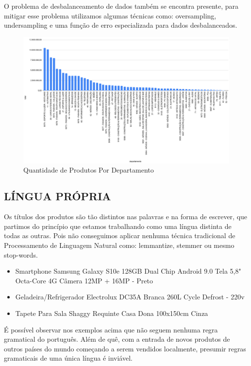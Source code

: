O problema de desbalanceamento de dados também se encontra presente, para mitigar esse problema utilizamos algumas técnicas como: oversampling, undersampling e  uma função de erro especializada para  dados desbalanceados.

\begin{figure}[htb]
	\caption{\label{char_bar_produtos_por_categoria} Quantidade de Produtos Por Departamento}
	\begin{center}
	    \includegraphics[width=\textwidth]{artigo/recursos/imagens/Quantidade de Produtos por Departamento.png}
	\end{center}
\end{figure}

\subsection{LÍNGUA PRÓPRIA}

Os títulos dos produtos são tão distintos nas palavras e na forma de escrever, que partimos do princípio que estamos trabalhando como uma língua distinta de todas as outras. Pois não conseguimos aplicar nenhuma técnica tradicional de Processamento de Linguagem Natural como: lemmantize, stemmer ou mesmo stop-words.

\begin{itemize}
\item Smartphone Samsung Galaxy S10e 128GB Dual Chip Android 9.0 Tela 5,8" Octa-Core 4G Câmera 12MP + 16MP - Preto
\item Geladeira/Refrigerador Electrolux DC35A Branca 260L Cycle Defrost - 220v
\item Tapete Para Sala Shaggy Requinte Casa Dona 100x150cm Cinza
\end{itemize}

É possível observar nos exemplos acima que não seguem nenhuma regra gramatical do português. Além de quê, com a entrada de novos produtos de outros países do mundo começando a serem vendidos localmente, presumir regras gramaticais de uma única língua é inviável.